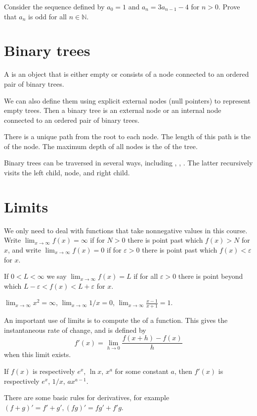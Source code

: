 \begin{Boxample}[4]
Consider the sequence defined by $a_0 = 1$ and $a_n = 3a_{n-1} - 4$ for $n > 0$. Prove that $a_n$ is odd for all $n \in \mathbb{N}$.
\end{Boxample}


\section{Binary trees}
A  is an object that is either empty or consists of a  node connected to an ordered pair of binary trees. 
 
We can also define them using explicit external nodes (null pointers) to represent empty trees. Then a binary tree is an external node or an internal node connected to an ordered pair of binary trees.

There is a unique path from the root to each node. The length of this path is the  of the node. The maximum depth of all nodes is the  of the tree.

Binary trees can be traversed in several ways, including , , . 
The latter recursively visits the left child, node, and right child.


\section{Limits}
We only need to deal with functions that take nonnegative values in this course.
Write $\lim_{x \to \infty} f(x) = \infty$ if for  $N>0$ there is  point past which $f(x) > N$ for  $x$, 
and write $\lim_{x\to\infty} f(x) = 0$ if for  $\varepsilon>0$ there is  point past which $f(x) < \varepsilon$ for  $x$.

If $0 < L < \infty$ we say $\lim_{x \to \infty} f(x) = L$ if for all $\varepsilon > 0$ there is  point 
beyond which $L - \varepsilon < f(x) < L + \varepsilon$ for  $x$.

\begin{Boxample}
$\lim_{x \to \infty} x^2 = \infty$, $\lim_{x \to \infty} 1/x = 0$, $\lim_{x\to \infty} \frac{x-1}{x+1} = 1$.
\end{Boxample}

An important use of limits is to compute the  of a function. This gives the instantaneous rate of change, and is defined by 
$$
f'(x) = \lim_{h\to 0} \frac{f(x+h) - f(x)}{h}
$$
when this limit exists.
\begin{Boxample}[4]
If $f(x)$ is respectively $e^x$, $\ln x$, $x^a$ for some constant $a$, then $f'(x)$ is respectively $e^x$, $1/x$, $ax^{a-1}$.
\end{Boxample}
There are some basic rules for derivatives, for example $(f+g)' = f'+g', (fg)' = fg'+f'g$.

